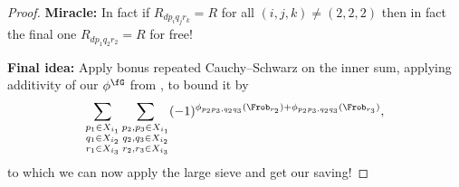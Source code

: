 \documentclass{lecturenotes}
\numberwithin{equation}{section}
\begin{document}
\begin{proof}
    \textbf{Miracle:}  In fact if $R_{dp_iq_jr_k}=R$ for all $(i,j,k)\neq (2,2,2)$ then in fact the final one $R_{dp_1q_2r_2}=R$ for free!

    \textbf{Final idea:}  Apply bonus repeated Cauchy--Schwarz on the inner sum, applying additivity of our $\phi^{\fG}$ from , to bound it by
    \[\sum_{\substack{p_1\in X_{i_1}\\q_1\in X_{i_2}\\r_1\in X_{i_3}}}
    \sum_{\substack{p_2,p_3\in X_{i_1}\\q_2,q_3\in X_{i_2}\\r_2,r_3\in X_{i_3}}}(-1)^{\phi_{p_2p_3,q_2q_3}(\Frob_{r_2})+\phi_{p_2p_3,q_2q_3}(\Frob_{r_3})},\]
    to which we can now apply the large sieve and get our saving!

\end{proof}

% 
\end{document}
